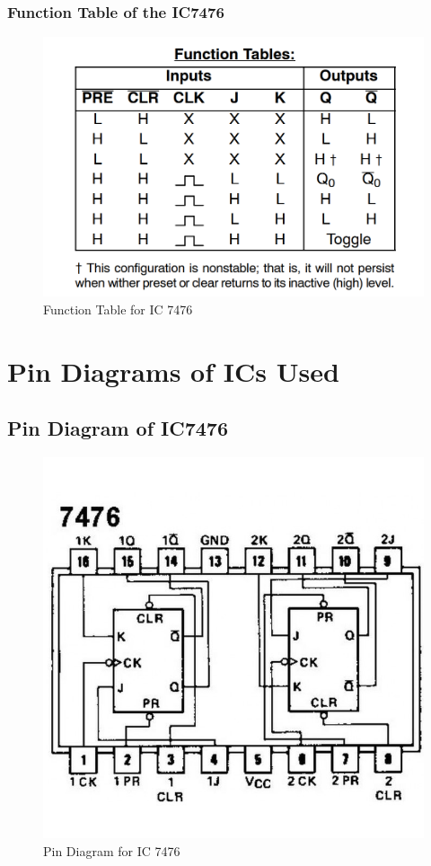 \documentclass[11pt]{article}
\begin{document}
\subsubsection{Function Table of the IC7476}
\begin{figure}[H]
	\centering
	\includegraphics[scale = 0.5]{7476 function table.png}
	\caption{Function Table for IC 7476}
\end{figure}

\section{Pin Diagrams of ICs Used}

\subsection{Pin Diagram of IC7476}
\begin{figure}[H]
	\centering
	\includegraphics[scale = 0.35]{7476.jpg}
	\caption{Pin Diagram for IC 7476}
\end{figure}
\end{document}
